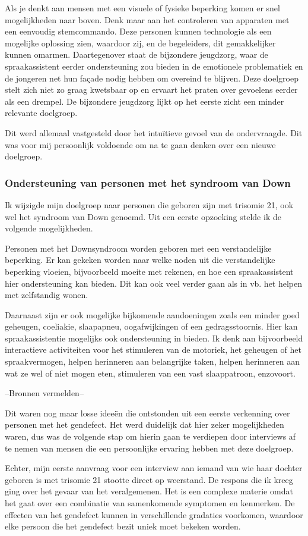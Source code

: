 Als je denkt aan mensen met een visuele of fysieke beperking komen er snel mogelijkheden naar boven. Denk maar aan het controleren van apparaten met een eenvoudig stemcommando. Deze personen kunnen technologie als een mogelijke oplossing zien, waardoor zij, en de begeleiders, dit gemakkelijker kunnen omarmen.
Daartegenover staat de bijzondere jeugdzorg, waar de spraakassistent eerder ondersteuning zou bieden in de emotionele problematiek en de jongeren net hun façade nodig hebben om overeind te blijven. Deze doelgroep stelt zich niet zo graag kwetsbaar op en ervaart het praten over gevoelens eerder als een drempel. De bijzondere jeugdzorg lijkt op het eerste zicht een minder relevante doelgroep.

Dit werd allemaal vastgesteld door het intuïtieve gevoel van de ondervraagde. Dit was voor mij persoonlijk voldoende om na te gaan denken over een nieuwe doelgroep.

\subsubsection{Ondersteuning van personen met het syndroom van Down}
\label{ondersteuning van personen met het syndroom van Down}
Ik wijzigde mijn doelgroep naar personen die geboren zijn met trisomie 21, ook wel het syndroom van Down genoemd. Uit een eerste opzoeking stelde ik de volgende mogelijkheden.

Personen met het Downsyndroom worden geboren met een verstandelijke beperking. Er kan gekeken worden naar welke noden uit die verstandelijke beperking vloeien, bijvoorbeeld moeite met rekenen, en hoe een spraakassistent hier ondersteuning kan bieden. Dit kan ook veel verder gaan als in vb. het helpen met zelfstandig wonen.

Daarnaast zijn er ook mogelijke bijkomende aandoeningen zoals een minder goed geheugen, coeliakie, slaapapneu, oogafwijkingen of een gedragsstoornis. Hier kan spraakassistentie mogelijks ook ondersteuning in bieden. Ik denk aan bijvoorbeeld interactieve activiteiten voor het stimuleren van de motoriek, het geheugen of het spraakvermogen, helpen herinneren aan belangrijke taken, helpen herinneren aan wat ze wel of niet mogen eten, stimuleren van een vast slaappatroon, enzovoort.

--Bronnen vermelden--

Dit waren nog maar losse ideeën die ontstonden uit een eerste verkenning over personen met het gendefect. Het werd duidelijk dat hier zeker mogelijkheden waren, dus was de volgende stap om hierin gaan te verdiepen door interviews af te nemen van mensen die een persoonlijke ervaring hebben met deze doelgroep.

Echter, mijn eerste aanvraag voor een interview aan iemand van wie haar dochter geboren is met trisomie 21 stootte direct op weerstand. De respons die ik kreeg ging over het gevaar van het veralgemenen. Het is een complexe materie omdat het gaat over een combinatie van samenkomende symptomen en kenmerken. De effecten van het gendefect kunnen in verschillende gradaties voorkomen, waardoor elke persoon die het gendefect bezit uniek moet bekeken worden.